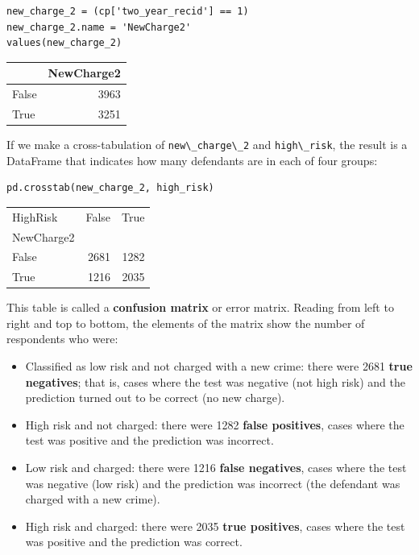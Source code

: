 \begin{lstlisting}[]
new_charge_2 = (cp['two_year_recid'] == 1)
new_charge_2.name = 'NewCharge2'
values(new_charge_2)
\end{lstlisting}

\begin{tabular}{lr}
\midrule
{} &  NewCharge2 \\
\midrule
False &        3963 \\
True  &        3251 \\
\midrule
\end{tabular}

If we make a cross-tabulation of
\passthrough{\lstinline!new\_charge\_2!} and
\passthrough{\lstinline!high\_risk!}, the result is a DataFrame that
indicates how many defendants are in each of four groups:

\begin{lstlisting}[]
pd.crosstab(new_charge_2, high_risk)
\end{lstlisting}

\begin{tabular}{lrr}
\midrule
HighRisk &  False &  True \\
NewCharge2 &        &       \\
\midrule
False      &   2681 &  1282 \\
True       &   1216 &  2035 \\
\midrule
\end{tabular}

This table is called a \textbf{confusion matrix} or error matrix.
Reading from left to right and top to bottom, the elements of the matrix
show the number of respondents who were:

\begin{itemize}
\item
  Classified as low risk and not charged with a new crime: there were
  2681 \textbf{true negatives}; that is, cases where the test was
  negative (not high risk) and the prediction turned out to be correct
  (no new charge).
\item
  High risk and not charged: there were 1282 \textbf{false positives},
  cases where the test was positive and the prediction was incorrect.
\item
  Low risk and charged: there were 1216 \textbf{false negatives}, cases
  where the test was negative (low risk) and the prediction was
  incorrect (the defendant was charged with a new crime).
\item
  High risk and charged: there were 2035 \textbf{true positives}, cases
  where the test was positive and the prediction was correct.
\end{itemize}

